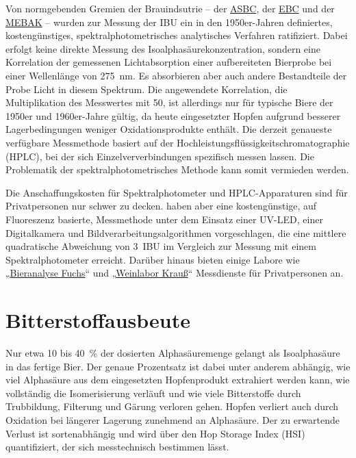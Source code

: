 \documentclass[a4paper,parskip=half]{scrartcl}
\begin{document}
Von normgebenden Gremien der Brauindsutrie – der \href{https://www.asbcnet.org}{ASBC}, der \href{https://europeanbreweryconvention.eu}{EBC} und der \href{https://www.mebak.org}{MEBAK} – wurden zur Messung der IBU ein in den 1950er-Jahren definiertes, kostengünstiges, spektralphotometrisches analytisches Verfahren ratifiziert. Dabei erfolgt keine direkte Messung des Isoalphasäurekonzentration, sondern eine Korrelation der gemessenen Lichtabsorption einer aufbereiteten Bierprobe bei einer Wellenlänge von 275~nm. Es absorbieren aber auch andere Bestandteile der Probe Licht in diesem Spektrum. Die angewendete Korrelation, die Multiplikation des Messwertes mit 50, ist allerdings nur für typische Biere der 1950er und 1960er-Jahre gültig, da heute eingesetzter Hopfen aufgrund besserer Lagerbedingungen weniger Oxidationsprodukte enthält. Die derzeit genaueste
verfügbare Messmethode basiert auf der Hochleistungsflüssigkeitschromatographie (HPLC),
bei der sich Einzelververbindungen spezifisch messen lassen. Die Problematik der spektralphotometrisches Methode kann somit vermieden werden. \parencites{ASBC2011}{Hosom2017}[28]{Nottebohm2020}

Die Anschaffungskosten für Spektralphotometer und HPLC-Apparaturen sind für Privatpersonen nur schwer zu decken. \textcite{Calado2019} haben aber eine kostengünstige, auf Fluoreszenz basierte, Messmethode unter dem Einsatz einer UV-LED, einer Digitalkamera und Bildverarbeitungsalgorithmen vorgeschlagen, die eine mittlere quadratische Abweichung von 3~IBU im Vergleich zur Messung mit einem Spektralphotometer erreicht. Darüber hinaus bieten einige Labore wie „\href{https://bieranalyse.de}{Bieranalyse Fuchs}“ und „\href{https://www.weinlabor-krauss.de}{Weinlabor Krauß}“ Messdienste für Privatpersonen an.

\section*{Bitterstoffausbeute}

Nur etwa 10 bis 40~\% der dosierten Alphasäuremenge gelangt als Isoalphasäure in das fertige Bier. Der genaue Prozentsatz ist dabei unter anderem abhängig, wie viel Alphasäure aus dem eingesetzten Hopfenprodukt extrahiert werden kann, wie vollständig die Isomerisierung verläuft und wie viele Bitterstoffe durch Trubbildung, Filterung und Gärung verloren gehen. Hopfen verliert auch durch Oxidation bei längerer Lagerung zunehmend an Alphasäure. Der zu erwartende Verlust ist sortenabhängig und wird über den Hop Storage Index (HSI) quantifiziert, der sich messtechnisch bestimmen lässt. \parencites[9]{Malowicki2005}[103\psq]{Garetz1994} 
\end{document}
